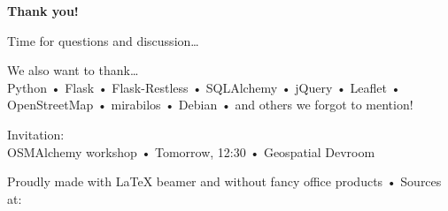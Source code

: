 \documentclass[aspectratio=43]{beamer}
\begin{document}
 \begin{frame}
  \centering

  \textbf{\huge{}Thank you!}

  {\large{}Time for questions and discussion…}

  \vspace{\baselineskip}
  {\scriptsize
   We also want to thank…\\
   Python • Flask • Flask-Restless • SQLAlchemy • jQuery • Leaflet • OpenStreetMap • mirabilos • Debian • and others we forgot to mention!
  }

  \vspace{\baselineskip}
  {
   Invitation:\\
   OSMAlchemy workshop • Tomorrow, 12:30 • Geospatial Devroom
  }

  \vspace{2\baselineskip}
  {
   \tiny
   Proudly made with \LaTeX{} beamer and without fancy office products • Sources at: \insertsourcelink
  }
 \end{frame}

\end{document}

